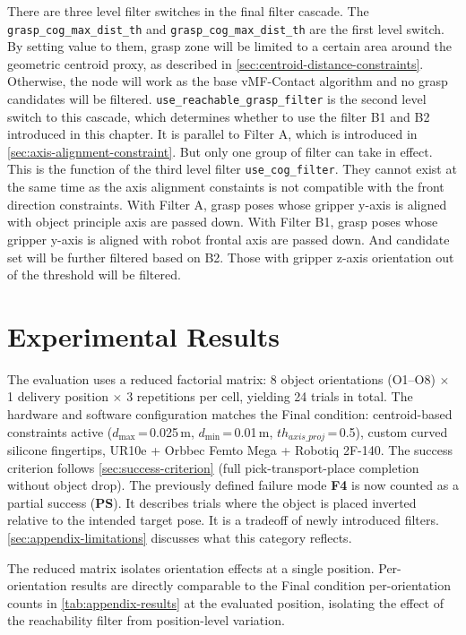 \documentclass[oneside,studentpaper]{wbk}
\newcommand{\param}[1]{\texttt{#1}}
\begin{document}
There are three level filter switches in the final filter cascade. The \param{grasp\_cog\_max\_dist\_th} and \param{grasp\_cog\_max\_dist\_th} are the first level switch. By setting value to them, grasp zone will be limited to a certain area around the geometric centroid proxy, as described in \cref{sec:centroid-distance-constraints}. Otherwise, the node will work as the base vMF-Contact algorithm and no grasp candidates will be filtered. \param{use\_reachable\_grasp\_filter} is the second level switch to this cascade, which determines whether to use the filter B1 and B2 introduced in this chapter. It is parallel to Filter A, which is introduced in \cref{sec:axis-alignment-constraint}. But only one group of filter can take in effect. This is the function of the third level filter \param{use\_cog\_filter}. They cannot exist at the same time as the axis alignment constaints is not compatible with the front direction constraints. With Filter A, grasp poses whose gripper y-axis is aligned with object principle axis are passed down. With Filter B1, grasp poses whose gripper y-axis is aligned with robot frontal axis are passed down. And candidate set will be further filtered based on B2. Those with gripper z-axis orientation out of the threshold will be filtered.

\section{Experimental Results}
\label{sec:appendix-results}

The evaluation uses a reduced factorial matrix: 8 object orientations (O1--O8) $\times$ 1 delivery position $\times$ 3 repetitions per cell, yielding 24 trials in total. The hardware and software configuration matches the Final condition: centroid-based constraints active ($d_{\max}$\,=\,0.025\,m, $d_{\min}$\,=\,0.01\,m, $th_{axis\_proj}$\,=\,0.5), custom curved silicone fingertips, UR10e + Orbbec Femto Mega + Robotiq 2F-140. The success criterion follows \cref{sec:success-criterion} (full pick-transport-place completion without object drop). The previously defined failure mode \textbf{F4} is now counted as a partial success (\textbf{PS}). It describes trials where the object is placed inverted relative to the intended target pose. It is a tradeoff of newly introduced filters. \cref{sec:appendix-limitations} discusses what this category reflects.

The reduced matrix isolates orientation effects at a single position. Per-orientation results are directly comparable to the Final condition per-orientation counts in \cref{tab:appendix-results} at the evaluated position, isolating the effect of the reachability filter from position-level variation.
\end{document}
